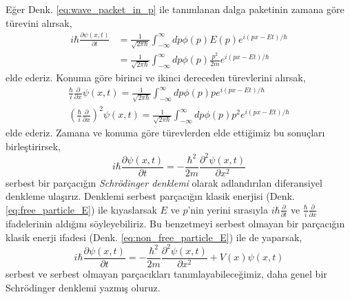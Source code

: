 \documentclass[00_kitap.tex]{subfiles}
\begin{document}
Eğer Denk. \ref{eq:wave_packet_in_p} ile tanımlanan dalga paketinin zamana göre türevini alırsak,
\begin{align}
i \hbar \frac { \partial \psi ( x , t ) } { \partial t } &= \frac { 1 } { \sqrt { 2 \pi \hbar } } \int _ { - \infty } ^ { \infty } d p \phi ( p ) E ( p ) e ^ { i ( p x - E t) / \hbar } \nonumber\\
&= \frac { 1 } { \sqrt { 2 \pi \hbar } } \int _ { - \infty } ^ { \infty } d p \phi ( p ) \frac { p ^ { 2 } } { 2 m } e ^ { i ( p x - E t ) / \hbar }
\end{align}
elde ederiz. Konuma göre birinci ve ikinci dereceden türevlerini alırsak,
\begin{align}
\frac { \hbar } { i } \frac { \partial } { \partial x } \psi ( x , t ) = \frac { 1 } { \sqrt { 2 \pi \hbar } } \int _ { - \infty } ^ { \infty } d p \phi ( p ) p e ^ { i ( p x - E t )/\hbar }\nonumber\\
\left( \frac { \hbar } { i } \frac { \partial } { \partial x } \right) ^ { 2 } \psi ( x , t ) = \frac { 1 } { \sqrt { 2 \pi \hbar } } \int _ { - \infty } ^ { \infty } d p \phi ( p ) p ^ { 2 } e ^ { i ( p x - E t )/ \hbar }
\end{align}
elde ederiz. Zamana ve konuma göre türevlerden elde ettiğimiz bu sonuçları birleştirirsek,
\begin{equation}
i\hbar \dfrac {\partial \psi \left( x,t\right) }{\partial t}=-\dfrac {\hbar ^{2}}{2m}\dfrac {\partial ^{2}\psi \left( x,t\right) }{\partial x^{2}}
\label{eq:schrodinger_eq_free_particle}
\end{equation}
serbest bir parçacığın \emph{Schrödinger denklemi} olarak adlandırılan diferansiyel denkleme ulaşırız.
Denklemi serbest parçacığın klasik enerjisi (Denk. \ref{eq:free_particle_E}) ile kıyaslarsak $E$ ve $p$'nin yerini  sırasıyla $i \hbar \frac { \partial } { \partial t }$ ve $\frac{\hbar}{i} \frac { \partial } { \partial x }$ ifadelerinin aldığını söyleyebiliriz. Bu benzetmeyi serbest olmayan bir parçacığın klasik enerji ifadesi (Denk. \ref{eq:non_free_particle_E}) ile de yaparsak,
\begin{equation}
i\hbar \dfrac {\partial \psi \left( x,t\right) }{\partial t}=-\dfrac {\hbar ^{2}}{2m}\dfrac {\partial ^{2}\psi \left( x,t\right) }{\partial x^{2}}+V\left( x\right) \psi \left( x,t\right)
\label{eq:schrodinger_eq}
\end{equation}
serbest ve serbest olmayan parçacıkları tanımlayabileceğimiz, daha genel bir Schrödinger denklemi yazmış oluruz.
\end{document}
